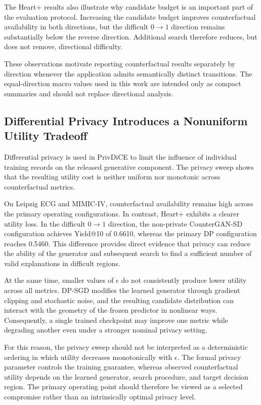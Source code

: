 \documentclass[preprint,12pt]{elsarticle}
\begin{document}
The Heart+ results also illustrate why candidate budget is an important part of
the evaluation protocol. Increasing the candidate budget improves
counterfactual availability in both directions, but the difficult
$0\rightarrow1$ direction remains substantially below the reverse direction.
Additional search therefore reduces, but does not remove, directional
difficulty.

These observations motivate reporting counterfactual results separately by
direction whenever the application admits semantically distinct transitions.
The equal-direction macro values used in this work are intended only as compact
summaries and should not replace directional analysis.


\subsection{Differential Privacy Introduces a Nonuniform Utility Tradeoff}
\label{subsec:discussion_dp}

Differential privacy is used in PrivDiCE to limit the influence of individual
training records on the released generative component. The privacy sweep shows
that the resulting utility cost is neither uniform nor monotonic across
counterfactual metrics.

On Leipzig ECG and MIMIC-IV, counterfactual availability remains high across
the primary operating configurations. In contrast, Heart+ exhibits a clearer
utility loss. In the difficult $0\rightarrow1$ direction, the non-private
CounterGAN-SD configuration achieves Yield@10 of 0.6610, whereas the primary
DP configuration reaches 0.5460. This difference provides direct evidence that
privacy can reduce the ability of the generator and subsequent search to find a
sufficient number of valid explanations in difficult regions.

At the same time, smaller values of $\epsilon$ do not consistently produce
lower utility across all metrics. DP-SGD modifies the learned generator through
gradient clipping and stochastic noise, and the resulting candidate
distribution can interact with the geometry of the frozen predictor in
nonlinear ways. Consequently, a single trained checkpoint may improve one
metric while degrading another even under a stronger nominal privacy setting.

For this reason, the privacy sweep should not be interpreted as a deterministic
ordering in which utility decreases monotonically with $\epsilon$. The formal
privacy parameter controls the training guarantee, whereas observed
counterfactual utility depends on the learned generator, search procedure, and
target decision region. The primary operating point should therefore be viewed
as a selected compromise rather than an intrinsically optimal privacy level.
\end{document}
